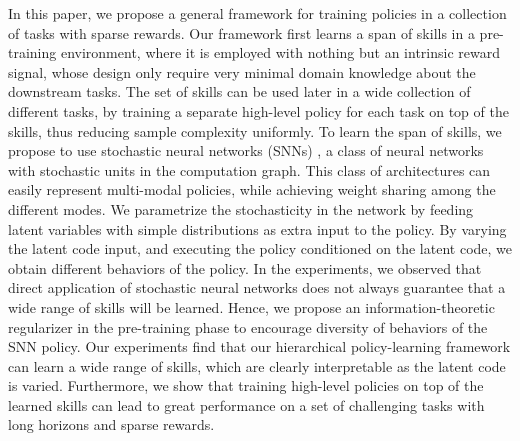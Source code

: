 \documentclass{article} %
\begin{document}
In this paper, we propose a general framework for training policies in a collection of tasks with sparse rewards.
Our framework first learns a span of skills in a pre-training environment, where it is employed with nothing but an intrinsic reward signal, whose design only require very minimal domain knowledge about the downstream tasks.
The set of skills can be used later in a wide collection of different tasks, by training a separate high-level policy for each task on top of the skills, thus reducing sample complexity uniformly.
To learn the span of skills, we propose to use stochastic neural networks (SNNs) \citep{neal1990learning, neal1992connectionist, Tang2014_FSNN}, a class of neural networks with stochastic units in the computation graph.
This class of architectures can easily represent multi-modal policies, while achieving weight sharing among the different modes.
We parametrize the stochasticity in the network by feeding latent variables with simple distributions as extra input to the policy.
By varying the latent code input, and executing the policy conditioned on the latent code, we obtain different behaviors of the policy.
In the experiments, we observed that direct application of stochastic neural networks does not always guarantee that a wide range of skills will be learned. 
Hence, we propose an information-theoretic regularizer in the pre-training phase to encourage diversity of behaviors of the SNN policy.
Our experiments find that our hierarchical policy-learning framework can learn a wide range of skills, which are clearly interpretable as the latent code is varied. Furthermore, we show that training high-level policies on top of the learned skills can lead to great performance on a set of challenging tasks with long horizons and sparse rewards. %


\end{document}

